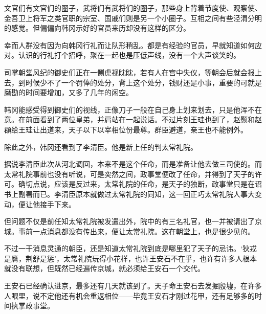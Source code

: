 文官们有文官们的圈子，武将们有武将们的圈子，那些身上背着节度使、观察使、金吾卫上将军之类官职的宗室、国戚们则是另一个小圈子。互相之间有些泾渭分明的感觉。但偏偏向韩冈示好的官员来历却没有这样的区分。

幸而人群没有因为向韩冈行礼而让队形稍乱。都是有经验的官员，早就知道如何应对。认识的行礼打个招呼，聚在一起也是压低声线，没有一个大声谈笑的。

司掌朝堂风纪的御史们正在一侧虎视眈眈，若有人在宫中失仪，等朝会后就会报上去，到时候少不了一个罚俸的处分，背上这个处分，钱财还是小事，重要的可就是磨勘的时间要增加，又多了几年的闲空。

韩冈能感受得到御史们的视线，正像刀子一般在自己身上划来划去，只是他浑不在意。在前面看到了两位皇弟，并肩站在一起说话。不过片刻王珪也到了，赵颢和赵頵给王珪让出道来，天子以下以宰相位份最尊。群臣避道，亲王也不能例外。

除此之外，韩冈还看到了李清臣。他是新上任的判太常礼院。

据说李清臣此次从河北调回，本来不是这个任命，而是准备让他去做三司使的。而太常礼院事前也没有听说，可是突然之间，政事堂便改了任命，并得到了天子的许可。确切点说，应该是反过来，太常礼院的任命，是天子的独断，政事堂只是在诏书上副署而已。李清臣原本就做过太常礼院的同知，这一回正巧太常礼院人事大变动，便让他接手下来。

但问题不仅是前任知太常礼院被发遣出外，院中的有三名礼官，也一并被请出了京城。事前一点消息都没有传出来，便让太常礼院。这在朝堂上，也是很少见的。

不过一干消息灵通的朝臣，还是知道太常礼院到底是哪里犯了天子的忌讳。‘狄戎是膺，荆舒是惩’，太常礼院玩得小花样，也许王安石不在乎，也许有许多人根本就没有联想，但既然已经遍传京城，就必须给王安石一个交代。

王安石已经确认进京，最多还有几天就该到了。天子命王安石去发掘殷墟，在许多人眼里，说不定他还有机会重返相位——毕竟王安石才刚过花甲，还有足够多的时间执掌政事堂。
